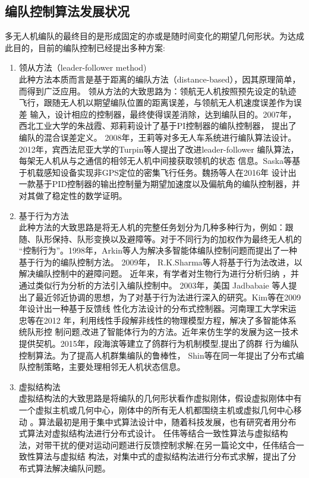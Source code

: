 \subsection{编队控制算法发展状况}
多无人机编队的最终目的是形成固定的亦或是随时间变化的期望几何形状。为达成此目的，目前的编队控制已经提出多种方案:
\begin{enumerate}
    \item 领从方法（leader-follower method)\\
        此种方法本质而言是基于距离的编队方法（distance-based），因其原理简单，而得到广泛应用。
        领从方法的大致思路为：领航无人机按照预先设定的轨迹飞行，跟随无人机以期望编队位置的距离误差，与领航无人机速度误差作为误差
        输入，设计相应的控制器，最终使得误差消除，达到编队目的。2007年，西北工业大学的朱战霞、郑莉莉设计了基于PI控制器的编队控制器，
        提出了编队的混合误差定义。\cite{ZhuZhanXia2007}
        2008年，王莉等对多无人车系统进行编队算法设计。\cite{WangLi2008}
        2012年，宾西法尼亚大学的Turpin等人提出了改进leader-follower 编队算法，每架无人机从与之通信的相邻无人机中间接获取领机的状态
        信息。\cite{Turpin2012Trajectory}Saska等基于机载感知设备实现非GPS定位的密集飞行任务。\cite{Saska2017System}魏扬等人在2016年
        设计出一款基于PID控制器的输出控制量为期望加速度以及偏航角的编队控制器，并对其做了稳定性的数学证明。\cite{WeiYang2016}
    \item 基于行为方法\\
        此种方法的大致思路是将无人机的完整任务划分为几种多种行为，例如：跟随、队形保持、队形变换以及避障等。对于不同行为的加权作为最终无人机的
        “控制行为”。1998年，Arkin等人为解决多智能体编队控制问题而提出了一种基于行为的编队控制方法。\cite{Balch1998Behavior} 2009年，
        R.K.Sharma等人将基于行为法改进，以解决编队控制中的避障问题。\cite{Sharma2009Collision} 近年来，有学者对生物行为进行分析归纳
        ，并通过类似行为分析的方法引入编队控制中。
        2003年，美国 Jadbabaie 等人提出了最近邻近协调的思想，为了对基于行为法进行深入的研究。\cite{Jadbabaie2003Coordination}Kim等在2009年设计出一种基于反馈线
        性化方法设计的分布式控制器。\cite{Kim2009}河南理工大学宋运忠等在2012 年，利用线性手段解非线性的物理模型方程，解决了多智能体系统队形控
        制问题,改进了智能体行为的方法。\cite{SongYunZhong2012}近年来仿生学的发展为这一技术提供契机。2015年，段海滨等建立了鸽群行为机制模型,提出了鸽群
        行为编队控制算法。\cite{DuanHaiBin2015}为了提高人机群集编队的鲁棒性，
        Shin等在同一年提出了分布式编队控制策略，主要处理相邻无人机状态信息。\cite{Jongho2015}
    \item 虚拟结构法\\
        虚拟结构法的大致思路是将编队的几何形状看作虚拟刚体，假设虚拟刚体中有一个虚拟主机或几何中心，刚体中的所有无人机都围绕主机或虚拟几何中心移动\cite{Lewis1997High}
        。算法最初是用于集中式算法设计中，随着科技发展，也有研究者用分布式算法对虚拟结构法进行分布式设计。
        任伟等结合一致性算法与虚拟结构法，对带干扰的便对运动问题进行反馈控制求解\cite{Ren2004Formation};在另一篇论文中，任伟结合一致性算法与虚拟结
        构法，对集中式的虚拟结构法进行分布式求解，提出了分布式算法解决编队问题。\cite{Ren2004Decentralized}
\end{enumerate}

